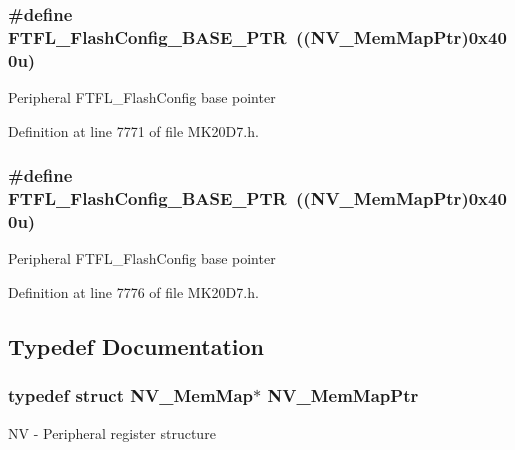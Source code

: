 \subsubsection[{\texorpdfstring{F\+T\+F\+L\+\_\+\+Flash\+Config\+\_\+\+B\+A\+S\+E\+\_\+\+P\+TR}{FTFL_FlashConfig_BASE_PTR}}]{\setlength{\rightskip}{0pt plus 5cm}\#define F\+T\+F\+L\+\_\+\+Flash\+Config\+\_\+\+B\+A\+S\+E\+\_\+\+P\+TR~(({\bf N\+V\+\_\+\+Mem\+Map\+Ptr})0x400u)}\hypertarget{group___n_v___peripheral_gad199a235b90fe3e6afb977f2d6a9c565}{}\label{group___n_v___peripheral_gad199a235b90fe3e6afb977f2d6a9c565}
Peripheral F\+T\+F\+L\+\_\+\+Flash\+Config base pointer 

Definition at line 7771 of file M\+K20\+D7.\+h.

\subsubsection[{\texorpdfstring{F\+T\+F\+L\+\_\+\+Flash\+Config\+\_\+\+B\+A\+S\+E\+\_\+\+P\+TR}{FTFL_FlashConfig_BASE_PTR}}]{\setlength{\rightskip}{0pt plus 5cm}\#define F\+T\+F\+L\+\_\+\+Flash\+Config\+\_\+\+B\+A\+S\+E\+\_\+\+P\+TR~(({\bf N\+V\+\_\+\+Mem\+Map\+Ptr})0x400u)}\hypertarget{group___n_v___peripheral_gad199a235b90fe3e6afb977f2d6a9c565}{}\label{group___n_v___peripheral_gad199a235b90fe3e6afb977f2d6a9c565}
Peripheral F\+T\+F\+L\+\_\+\+Flash\+Config base pointer 

Definition at line 7776 of file M\+K20\+D7.\+h.



\subsection{Typedef Documentation}
\subsubsection[{\texorpdfstring{N\+V\+\_\+\+Mem\+Map\+Ptr}{NV_MemMapPtr}}]{\setlength{\rightskip}{0pt plus 5cm}typedef struct {\bf N\+V\+\_\+\+Mem\+Map}$\ast$ {\bf N\+V\+\_\+\+Mem\+Map\+Ptr}}\hypertarget{group___n_v___peripheral_ga9aac431b01e6b976f2f4e32409ab725f}{}\label{group___n_v___peripheral_ga9aac431b01e6b976f2f4e32409ab725f}
NV -\/ Peripheral register structure 
